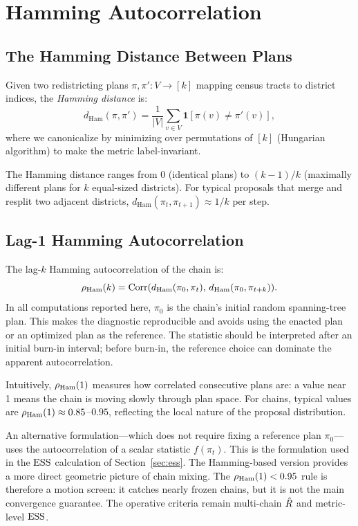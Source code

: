 \section{Hamming Autocorrelation}
\label{sec:hamming}

\subsection{The Hamming Distance Between Plans}

Given two redistricting plans $\pi, \pi' : V \to [k]$ mapping census
tracts to district indices, the \emph{Hamming distance} is:
\[
  d_{\mathrm{Ham}}(\pi, \pi') = \frac{1}{|V|} \sum_{v \in V}
  \mathbf{1}[\pi(v) \neq \pi'(v)],
\]
where we canonicalize by minimizing over permutations of $[k]$ (Hungarian
algorithm) to make the metric label-invariant.

The Hamming distance ranges from 0 (identical plans) to $(k-1)/k$
(maximally different plans for $k$ equal-sized districts).
For typical \recom{} proposals that merge and resplit two adjacent
districts, $d_{\mathrm{Ham}}(\pi_t, \pi_{t+1}) \approx 1/k$ per step.

\subsection{Lag-1 Hamming Autocorrelation}

The lag-$k$ Hamming autocorrelation of the chain is:
\[
  \rho_{\mathrm{Ham}}(k) = \mathrm{Corr}(d_{\mathrm{Ham}}(\pi_0, \pi_t),\,
                            d_{\mathrm{Ham}}(\pi_0, \pi_{t+k})).
\]
In all computations reported here, $\pi_0$ is the chain's initial random
spanning-tree plan. This makes the diagnostic reproducible and avoids using
the enacted plan or an optimized plan as the reference. The statistic should
be interpreted after an initial burn-in interval; before burn-in, the reference
choice can dominate the apparent autocorrelation.

Intuitively, $\rho_{\mathrm{Ham}}(1)$ measures how correlated consecutive plans are:
a value near 1 means the chain is moving slowly through plan space.
For \recom{} chains, typical values are $\rho_{\mathrm{Ham}}(1) \approx 0.85$--$0.95$,
reflecting the local nature of the proposal distribution.

An alternative formulation---which does not require fixing a reference
plan $\pi_0$---uses the autocorrelation of a scalar statistic $f(\pi_t)$.
This is the formulation used in the $\mathrm{ESS}$ calculation of
Section~\ref{sec:ess}.
The Hamming-based version provides a more direct geometric picture of
chain mixing.
The $\rho_{\mathrm{Ham}}(1) < 0.95$ rule is therefore a motion screen: it catches nearly
frozen chains, but it is not the main convergence guarantee. The operative
criteria remain multi-chain $\hat{R}$ and metric-level $\mathrm{ESS}$.

